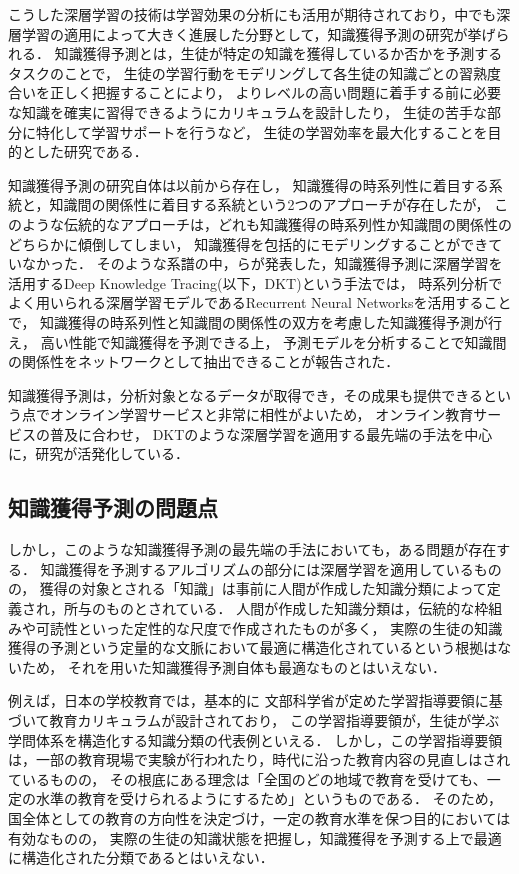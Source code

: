 こうした深層学習の技術は学習効果の分析にも活用が期待されており，中でも深層学習の適用によって大きく進展した分野として，知識獲得予測の研究が挙げられる．
知識獲得予測とは，生徒が特定の知識を獲得しているか否かを予測するタスクのことで，
生徒の学習行動をモデリングして各生徒の知識ごとの習熟度合いを正しく把握することにより，
よりレベルの高い問題に着手する前に必要な知識を確実に習得できるようにカリキュラムを設計したり，
生徒の苦手な部分に特化して学習サポートを行うなど，
生徒の学習効率を最大化することを目的とした研究である．

知識獲得予測の研究自体は以前から存在し，
知識獲得の時系列性に着目する系統と，知識間の関係性に着目する系統という2つのアプローチが存在したが，
このような伝統的なアプローチは，どれも知識獲得の時系列性か知識間の関係性のどちらかに傾倒してしまい，
知識獲得を包括的にモデリングすることができていなかった．
そのような系譜の中，\cite{piech2015deep}らが発表した，知識獲得予測に深層学習を活用するDeep Knowledge Tracing(以下，DKT)という手法では，
時系列分析でよく用いられる深層学習モデルであるRecurrent Neural Networks\cite{williams1989learning}を活用することで，
知識獲得の時系列性と知識間の関係性の双方を考慮した知識獲得予測が行え，
高い性能で知識獲得を予測できる上，
予測モデルを分析することで知識間の関係性をネットワークとして抽出できることが報告された．

知識獲得予測は，分析対象となるデータが取得でき，その成果も提供できるという点でオンライン学習サービスと非常に相性がよいため，
オンライン教育サービスの普及に合わせ，
DKTのような深層学習を適用する最先端の手法を中心に，研究が活発化している．

\subsection{知識獲得予測の問題点}

しかし，このような知識獲得予測の最先端の手法においても，ある問題が存在する．
知識獲得を予測するアルゴリズムの部分には深層学習を適用しているものの，
獲得の対象とされる「知識」は事前に人間が作成した知識分類によって定義され，所与のものとされている．
人間が作成した知識分類は，伝統的な枠組みや可読性といった定性的な尺度で作成されたものが多く，
実際の生徒の知識獲得の予測という定量的な文脈において最適に構造化されているという根拠はないため，
それを用いた知識獲得予測自体も最適なものとはいえない．

例えば，日本の学校教育では，基本的に
文部科学省が定めた学習指導要領\cite{gakushushidouyouryou}に基づいて教育カリキュラムが設計されており，
この学習指導要領が，生徒が学ぶ学問体系を構造化する知識分類の代表例といえる．
しかし，この学習指導要領は，一部の教育現場で実験が行われたり，時代に沿った教育内容の見直しはされているものの，
その根底にある理念は「全国のどの地域で教育を受けても、一定の水準の教育を受けられるようにするため」\cite{gakushushidouyouryou}というものである．
そのため，国全体としての教育の方向性を決定づけ，一定の教育水準を保つ目的においては有効なものの，
実際の生徒の知識状態を把握し，知識獲得を予測する上で最適に構造化された分類であるとはいえない．


